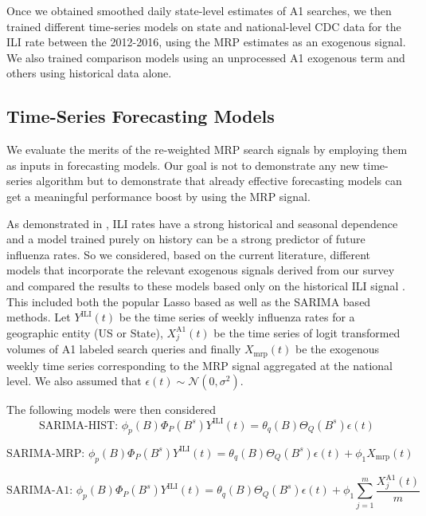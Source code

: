 \documentclass[fleqn,10pt]{wlscirep}
\begin{document}
Once we obtained smoothed daily state-level estimates of A1 searches, we then trained different time-series models on state and national-level CDC data for the ILI rate between the 2012-2016, using the MRP estimates as an exogenous signal. We also trained comparison models using an unprocessed A1 exogenous term and others using historical data alone. 

\subsection*{Time-Series Forecasting Models}

We evaluate the merits of the re-weighted MRP search signals by employing them as inputs in forecasting models. Our goal is not to demonstrate any new time-series algorithm but to demonstrate that already effective forecasting models can get a meaningful performance boost by using the MRP signal. 

As demonstrated in \cite{lazer_etal_2014}, ILI rates have a strong historical and seasonal dependence and a model trained purely on history can be a strong predictor of future influenza rates. So we considered, based on the current literature, different models that incorporate the relevant exogenous signals derived from our survey and compared the results to these models based only on the historical ILI signal \cite{yang_etal_2015}. This included both the popular Lasso based \cite{yang_etal_2015} as well as the SARIMA based methods. Let $Y^{\text{ILI}}(t)$ be the time series of weekly influenza rates for a geographic entity (US or State), $X_j^{\text{A1}}(t)$ be the time series of logit transformed volumes of A1 labeled search queries and finally $X_{\text{mrp}}(t)$ be the exogenous weekly time series corresponding to the MRP signal aggregated at the national level. We also assumed that $\epsilon(t) \sim \mathcal{N}(0,\sigma^2)$. 

The following models were then considered
\begin{equation}
 \text{SARIMA-HIST: } 
 \phi_p(B)\Phi_P(B^s)Y^{\text{ILI}}(t) = \theta_q(B)\Theta_Q(B^s)\epsilon(t) 
 \end{equation}
 
 \begin{equation}
 \text{SARIMA-MRP: }  
 \phi_p(B)\Phi_P(B^s)Y^{\text{ILI}}(t) =  \theta_q(B)\Theta_Q(B^s)\epsilon(t) + \phi_1 X_{\text{mrp}}(t)
\end{equation}

\begin{equation}
\text{SARIMA-A1: } \phi_p(B)\Phi_P(B^s)Y^{\text{ILI}}(t) =  \theta_q(B)\Theta_Q(B^s)\epsilon(t) + \phi_1 \sum_{j=1}^m \frac{X_j^{\text{A1}}(t)}{m}
\end{equation}
\end{document}
